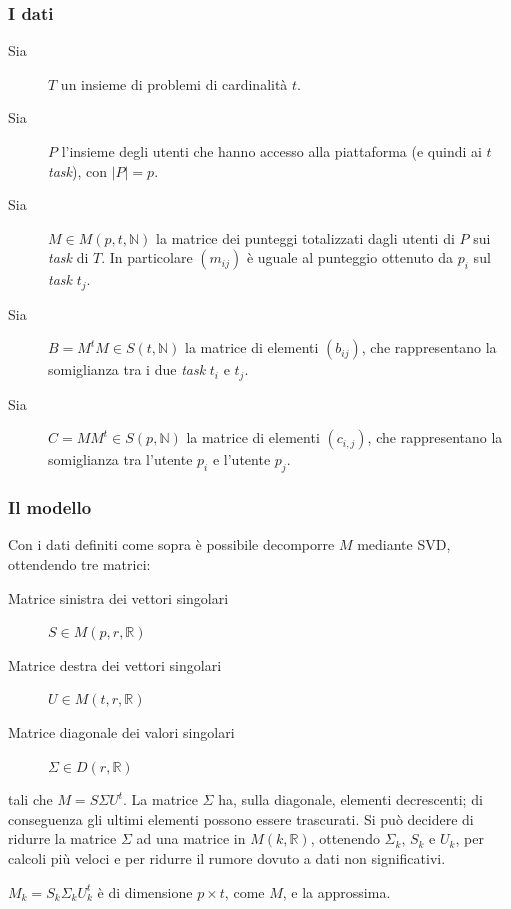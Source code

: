 \documentclass[12pt,a4paper]{article}
\theoremstyle{thm}
\theoremstyle{def}
\begin{document}

\subsubsection{I dati}
\label{dati}
\begin{description}
\item[{\sc Sia}] $T$ un insieme di problemi di cardinalità $t$.
\item[{\sc Sia}] $P$ l'insieme degli utenti che hanno accesso alla piattaforma (e quindi ai $t$ \textit{task}), con $|P| = p$.
\item[{\sc Sia}] $M \in M(p,t,\mathds{N})$ la matrice dei punteggi totalizzati dagli utenti di $P$ sui \textit{task} di $T$. In particolare $(m_{ij})$ è uguale al punteggio ottenuto da $p_i$ sul \textit{task} $t_j$.
\item[{\sc Sia}] $B=M^tM \in S(t, \mathds{N})$ la matrice di elementi $(b_{ij})$, che rappresentano la somiglianza tra i due \textit{task} $t_i$ e $t_j$.
\item[{\sc Sia}] $C=MM^t \in S(p, \mathds{N})$ la matrice di elementi $(c_{i,j})$, che rappresentano la somiglianza tra l'utente $p_i$ e l'utente $p_j$.
\end{description}


\subsubsection{Il modello}
\label{k}
Con i dati definiti come sopra è possibile decomporre $M$ mediante SVD, ottendendo tre matrici:
\begin{description}
\item[{\sc Matrice sinistra dei vettori singolari}] $S \in M(p,r,\mathds{R})$
\item[{\sc Matrice destra dei vettori singolari}] $U \in M(t,r,\mathds{R})$
\item[{\sc Matrice diagonale dei valori singolari}] $\Sigma \in D(r,\mathds{R})$
\end{description}
tali che $M=S\Sigma U^t$.
La matrice $\Sigma$ ha, sulla diagonale, elementi decrescenti; di conseguenza gli ultimi elementi possono essere trascurati.
Si può decidere di ridurre la matrice $\Sigma$ ad una matrice in $M(k, \mathds{R})$, ottenendo $\Sigma_k$, $S_k$ e $U_k$, per calcoli più veloci e per ridurre il rumore dovuto a dati non significativi.

$M_k = S_k \Sigma_k U_k^t$ è di dimensione $p \times t$, come $M$, e la approssima.
\end{document}
